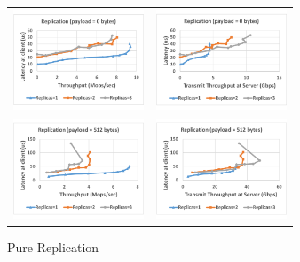 \documentclass[letterpaper,twocolumn,10pt]{article}
\begin{document}
\begin{figure}
\begin{tabular}{cc}
\begin{minipage}{0.25\textwidth}
  \hspace{-0.17in}
  \includegraphics[width=\textwidth,height=3cm]{results/replication_mops_0.pdf}
\end{minipage}&
\begin{minipage}{0.25\textwidth}
  \hspace{-0.37in}
  \includegraphics[width=\textwidth,height=3cm]{results/replication_gbps_0.pdf}
\end{minipage}\\
\begin{minipage}{0.25\textwidth}
  \hspace{-0.17in}
  \includegraphics[width=\textwidth,height=3cm]{results/replication_mops_512.pdf}
\end{minipage}&
\begin{minipage}{0.25\textwidth}
  \hspace{-0.37in}
  \includegraphics[width=\textwidth,height=3cm]{results/replication_gbps_512.pdf}
\end{minipage}
\end{tabular}
\caption{Pure Replication}
\label{fig:pure_rep}
\end{figure}
\end{document}
